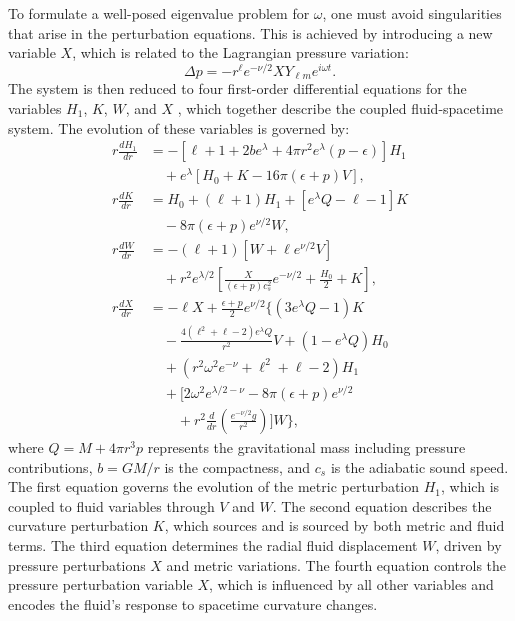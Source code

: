 To formulate a well-posed eigenvalue problem for \(\omega\), one must avoid singularities that arise in the perturbation equations. This is achieved by introducing a new variable \(X\), which is related to the Lagrangian pressure variation:
\begin{equation}
	\Delta p = -r^\ell e^{-\nu/2} X Y_{\ell m} e^{i\omega t}.
\end{equation}
The system is then reduced to four first-order differential equations for the variables \(H_1\), \(K\), \(W\), and \(X\) \cite{Lindblom_1983,detweiler85}, which together describe the coupled fluid-spacetime system. The evolution of these variables is governed by\cite{detweiler85}:
\begin{equation}
	\begin{aligned}
		r \frac{dH_1}{dr} &= -\left[\ell + 1 + 2b e^\lambda + 4\pi r^2 e^\lambda (p - \epsilon)\right] H_1 \\
		& \quad + e^\lambda \left[H_0 + K - 16\pi (\epsilon + p) V\right], \\ 
		r \frac{dK}{dr} &= H_0 + (\ell + 1) H_1 + \left[e^\lambda Q - \ell - 1\right] K \\
		& \quad - 8\pi (\epsilon + p) e^{\nu/2} W, \\
		r \frac{dW}{dr} &= -(\ell + 1)\left[W + \ell e^{\nu/2} V\right] \\
		& \quad + r^2 e^{\lambda/2} \left[\frac{X}{(\epsilon + p)c_s^2} e^{-\nu/2} + \frac{H_0}{2} + K\right], \\
		r \frac{dX}{dr} &= -\ell X + \frac{\epsilon + p}{2} e^{\nu/2} \Bigg\{ (3e^\lambda Q - 1) K \\
		& \quad - \frac{4(\ell^2 + \ell - 2) e^\lambda Q}{r^2} V + (1 - e^\lambda Q) H_0 \\
		& \quad + \left(r^2 \omega^2 e^{-\nu} + \ell^2 + \ell - 2\right) H_1 \\
		& \quad + \bigg[2\omega^2 e^{\lambda/2 - \nu} - 8\pi (\epsilon + p) e^{\nu/2} \\
		& \quad \quad + r^2 \frac{d}{dr} \left( \frac{e^{-\nu/2} g}{r^2} \right) \bigg] W \Bigg\},
	\end{aligned}
\end{equation}
where \(Q = M + 4\pi r^3 p\) represents the gravitational mass including pressure contributions, \(b = GM/r\) is the compactness, and \(c_s\) is the adiabatic sound speed. The first equation governs the evolution of the metric perturbation \(H_1\), which is coupled to fluid variables through \(V\) and \(W\). The second equation describes the curvature perturbation \(K\), which sources and is sourced by both metric and fluid terms. The third equation determines the radial fluid displacement \(W\), driven by pressure perturbations \(X\) and metric variations. The fourth equation controls the pressure perturbation variable \(X\), which is influenced by all other variables and encodes the fluid's response to spacetime curvature changes.



